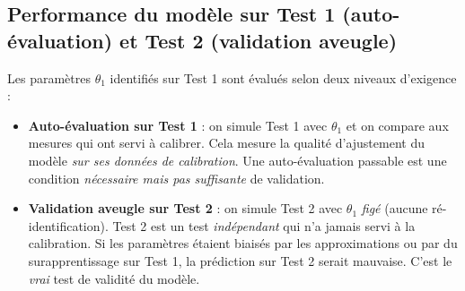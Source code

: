 \documentclass[11pt,a4paper]{article}
\begin{document}
\subsection{Performance du modèle sur Test 1 (auto-évaluation) et Test 2 (validation aveugle)}\label{sec:validation_aveugle}

Les paramètres $\theta_1$ identifiés sur Test 1 sont évalués selon deux niveaux
d'exigence :

\begin{itemize}[itemsep=2pt]
\item \textbf{Auto-évaluation sur Test 1} : on simule Test 1 avec $\theta_1$ et on compare
aux mesures qui ont servi à calibrer. Cela mesure la qualité d'ajustement du modèle
\emph{sur ses données de calibration}. Une auto-évaluation passable est une condition
\emph{nécessaire mais pas suffisante} de validation.
\item \textbf{Validation aveugle sur Test 2} : on simule Test 2 avec $\theta_1$ \emph{figé}
(aucune ré-identification). Test 2 est un test \emph{indépendant} qui n'a jamais servi à
la calibration. Si les paramètres étaient biaisés par les approximations ou par du
surapprentissage sur Test 1, la prédiction sur Test 2 serait mauvaise. C'est le
\emph{vrai} test de validité du modèle.
\end{itemize}
\end{document}
